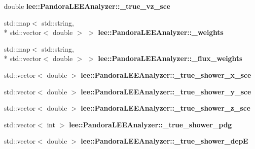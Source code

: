 \begin{DoxyCompactItemize}
\item 
\hypertarget{group__lee_ga5ac99bc027e85044950f2f502d3fffb0}{double {\bfseries lee\-::\-Pandora\-L\-E\-E\-Analyzer\-::\-\_\-true\-\_\-vz\-\_\-sce}}\label{group__lee_ga5ac99bc027e85044950f2f502d3fffb0}

\item 
\hypertarget{group__lee_ga114a52d8c3bfec336e931f1d4d8e6687}{std\-::map$<$ std\-::string, \\*
std\-::vector$<$ double $>$ $>$ {\bfseries lee\-::\-Pandora\-L\-E\-E\-Analyzer\-::\-\_\-weights}}\label{group__lee_ga114a52d8c3bfec336e931f1d4d8e6687}

\item 
\hypertarget{group__lee_ga5d5ebf6e8ca021c662ee2589ebf13f46}{std\-::map$<$ std\-::string, \\*
std\-::vector$<$ double $>$ $>$ {\bfseries lee\-::\-Pandora\-L\-E\-E\-Analyzer\-::\-\_\-flux\-\_\-weights}}\label{group__lee_ga5d5ebf6e8ca021c662ee2589ebf13f46}

\item 
\hypertarget{group__lee_ga5a4c4d805d124adaddb51a03be0af692}{std\-::vector$<$ double $>$ {\bfseries lee\-::\-Pandora\-L\-E\-E\-Analyzer\-::\-\_\-true\-\_\-shower\-\_\-x\-\_\-sce}}\label{group__lee_ga5a4c4d805d124adaddb51a03be0af692}

\item 
\hypertarget{group__lee_ga2509960b89cf002d160e0c298575eafd}{std\-::vector$<$ double $>$ {\bfseries lee\-::\-Pandora\-L\-E\-E\-Analyzer\-::\-\_\-true\-\_\-shower\-\_\-y\-\_\-sce}}\label{group__lee_ga2509960b89cf002d160e0c298575eafd}

\item 
\hypertarget{group__lee_gacb0f3d491c4acf888d0a787624627b57}{std\-::vector$<$ double $>$ {\bfseries lee\-::\-Pandora\-L\-E\-E\-Analyzer\-::\-\_\-true\-\_\-shower\-\_\-z\-\_\-sce}}\label{group__lee_gacb0f3d491c4acf888d0a787624627b57}

\item 
\hypertarget{group__lee_gac1f312260669f165f847286e4512224d}{std\-::vector$<$ int $>$ {\bfseries lee\-::\-Pandora\-L\-E\-E\-Analyzer\-::\-\_\-true\-\_\-shower\-\_\-pdg}}\label{group__lee_gac1f312260669f165f847286e4512224d}

\item 
\hypertarget{group__lee_ga4f376ec3a74610d2b6e5ea3be722182c}{std\-::vector$<$ double $>$ {\bfseries lee\-::\-Pandora\-L\-E\-E\-Analyzer\-::\-\_\-true\-\_\-shower\-\_\-dep\-E}}\label{group__lee_ga4f376ec3a74610d2b6e5ea3be722182c}


\end{DoxyCompactItemize}
